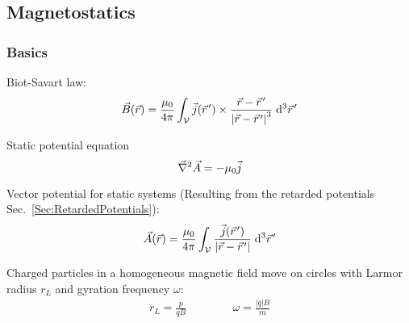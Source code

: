 	\subsection{Magnetostatics}
		\subsubsection{Basics}
			\noindent
			Biot-Savart law:
			\begin{equation}
				\vec{B}(\vec{r}) = \frac{\mu_0}{4\pi}\int_{\mathcal{V}} \vec{j}(\pvec{r}')\times\frac{\vec{r}-\pvec{r}'}{\left|\vec{r}-\pvec{r}'\right|^3}\;\diff^3\pvec{r}'
			\end{equation}

			\noindent
			Static potential equation
			\begin{equation}
				\vec{\nabla}^2 \vec{A} = - \mu_0 \vec{j}
			\end{equation}

			\noindent
			Vector potential for static systems (Resulting from the retarded potentials Sec.~\ref{Sec:RetardedPotentials}):
			\begin{equation}
				\vec{A}(\vec{r}) = \frac{\mu_0}{4\pi} \int_{\mathcal{V}} \frac{\vec{j}(\pvec{r}')}{\left|\vec{r}-\pvec{r}'\right|} \;\diff^3\pvec{r}'
			\end{equation}

			\noindent
			Charged particles in a homogeneous magnetic field move on circles with Larmor radius $r_L$ and gyration frequency $\omega$:
			\begin{equation}
				\begin{aligned}
					r_L = \frac{p}{qB} &&\hspace{30pt} %
					\omega = \frac{|q| B}{m}
				\end{aligned}
			\end{equation}

